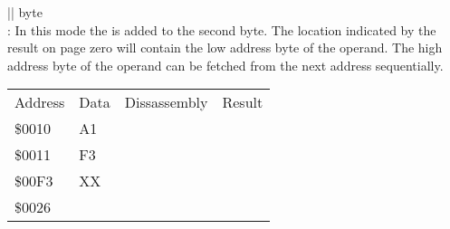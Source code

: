 \documentclass[letterpaper,10pt,english]{sphinxmanual}
\begin{document}
\begin{savenotes}\sphinxattablestart
\sphinxthistablewithglobalstyle
\centering
\begin{tabular}[t]{|*{1}{|}}
\sphinxtoprule
\sphinxstyletheadfamily 
{}\sphinxhyphen{}byte
\\
\sphinxmidrule
\sphinxtableatstartofbodyhook
\sphinxAtStartPar
{}: In this mode the
 is added to the second byte. The location indicated by
the result on page zero will contain the low address byte of the
operand. The high address byte of the operand can be fetched from the
next address sequentially.

\sphinxAtStartPar
{}


\begin{savenotes}\sphinxattablestart
\sphinxthistablewithglobalstyle
\centering
\begin{tabulary}{\linewidth}[t]{|T|T|T|T|}
\sphinxtoprule
\sphinxstyletheadfamily 
\sphinxAtStartPar
Address
&\sphinxstyletheadfamily 
\sphinxAtStartPar
Data
&\sphinxstyletheadfamily 
\sphinxAtStartPar
Dissassembly
&\sphinxstyletheadfamily 
\sphinxAtStartPar
Result
\\
\sphinxmidrule
\sphinxtableatstartofbodyhook
\sphinxAtStartPar
\$0010
&
\sphinxAtStartPar
A1
&%
&%
\\
\sphinxAtStartPar
\$0011
&
\sphinxAtStartPar
F3
&&\\
\sphinxAtStartPar
\$00F3
&
\sphinxAtStartPar
XX
&&\\
\sphinxAtStartPar
\$0026
&
&&\\

\end{tabulary}
\end{savenotes}
\end{tabular}
\end{savenotes}
\end{document}
